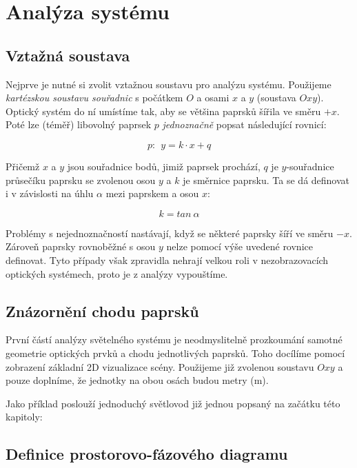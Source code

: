 \section{Analýza systému}

\subsection{Vztažná soustava}

Nejprve je nutné si zvolit vztažnou soustavu pro analýzu systému. Použijeme \emph{kartézskou soustavu souřadnic} s počátkem $O$ a osami $x$ a $y$ (soustava $Oxy$). Optický systém do ní umístíme tak, aby se většina paprsků šířila ve směru $+x$. Poté lze (téměř) libovolný paprsek $p$ \emph{jednoznačně} popsat následující rovnicí:

\[ p:\ \ y = k \cdot x + q \]

Přičemž $x$ a $y$ jsou souřadnice bodů, jimiž paprsek prochází, $q$ je $y$-souřadnice průsečíku paprsku se zvolenou osou $y$ a $k$ je směrnice paprsku. Ta se dá definovat i v závislosti na úhlu $\alpha$ mezi paprskem a osou $x$:

\[ k = tan\ \alpha \]

Problémy s nejednoznačností nastávají, když se některé paprsky šíří ve směru $-x$. Zároveň paprsky rovnoběžné s osou $y$ nelze pomocí výše uvedené rovnice definovat. Tyto případy však zpravidla nehrají velkou roli v nezobrazovacích optických systémech, proto je z analýzy vypouštíme.


\subsection{Znázornění chodu paprsků}
První částí analýzy světelného systému je neodmyslitelně prozkoumání samotné geometrie optických prvků a chodu jednotlivých paprsků. Toho docílíme pomocí zobrazení základní 2D vizualizace scény. Použijeme již zvolenou soustavu $Oxy$ a pouze doplníme, že jednotky na obou osách budou metry ($\mathrm{m}$).

Jako příklad poslouží jednoduchý světlovod již jednou popsaný na začátku této kapitoly:



\subsection{Definice prostorovo-fázového diagramu}

